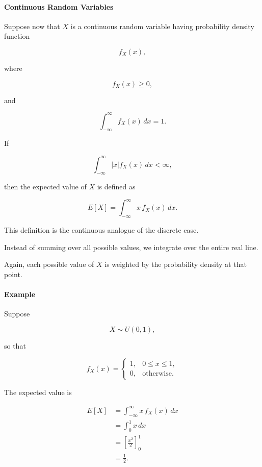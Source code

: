 \documentclass[11pt]{article}
\begin{document}
\begin{mdframed}[
		linewidth=0.8pt,
		roundcorner=6pt,
		backgroundcolor=gray!5,
		linecolor=gray!60,
		innertopmargin=10pt,
		innerbottommargin=10pt,
		innerleftmargin=10pt,
		innerrightmargin=10pt
		]
		\bigskip
		
		\paragraph{Continuous Random Variables}
		
		Suppose now that $X$ is a continuous random variable having probability
		density function
		
		\[
		f_X(x),
		\]
		
		where
		
		\[
		f_X(x)\ge0,
		\]
		
		and
		
		\[
		\int_{-\infty}^{\infty}f_X(x)\,dx=1.
		\]
		
		If
		
		\[
		\int_{-\infty}^{\infty}|x|f_X(x)\,dx<\infty,
		\]
		
		then the expected value of $X$ is defined as
		
		\[
		\boxed{
			E[X]
			=
			\int_{-\infty}^{\infty}
			x\,f_X(x)\,dx.
		}
		\]
		
		This definition is the continuous analogue of the discrete case.
		
		Instead of summing over all possible values, we integrate over the entire
		real line.
		
		Again, each possible value of $X$ is weighted by the probability density at
		that point.
		
		\bigskip
		
		\paragraph{Example}
		
		Suppose
		
		\[
		X\sim U(0,1),
		\]
		
		so that
		
		\[
		f_X(x)=
		\begin{cases}
			1,&0\le x\le1,\\
			0,&\text{otherwise}.
		\end{cases}
		\]
		
		The expected value is
		
		\[
		\begin{aligned}
			E[X]
			&=
			\int_{-\infty}^{\infty}
			x\,f_X(x)\,dx
			\\[0.3cm]
			&=
			\int_0^1x\,dx
			\\[0.3cm]
			&=
			\left[
			\frac{x^2}{2}
			\right]_0^1
			\\[0.3cm]
			&=
			\frac12.
		\end{aligned}
		\]
		

\end{mdframed}
\end{document}
